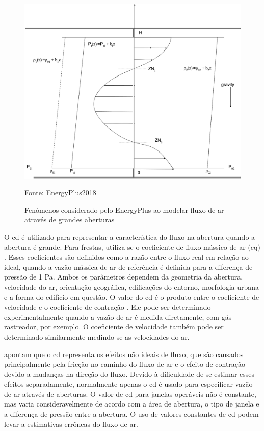 \documentclass[brazil,hardcopy,openany]{ufscthesis} %
\newcommand{\source}[1]{\small \caption*{Fonte: {#1}} } %
\newcommand{\figsize}{.6}
\begin{document}
\begin{figure}[h]
	\centering
	\caption{Fenômenos considerado pelo EnergyPlus ao modelar fluxo de ar através de grandes aberturas}
	\includegraphics[width=\figsize\linewidth]{img/detailed_opening.png}
	\label{fig:DetailedOpening}
	\source{EnergyPlus2018}
\end{figure}

O \acrfull{cd} é utilizado para representar a característica do fluxo na abertura quando a abertura é grande. Para frestas, utiliza-se o coeficiente de fluxo mássico de ar (\acrshort{cq}) \cite{Arendt2017}.
Esses coeficientes são definidos como a razão entre o fluxo real em relação ao	ideal, quando a vazão mássica de ar de referência é definida para a diferença de pressão de 1 Pa. Ambos os parâmetros dependem da geometria da abertura, velocidade do ar, orientação geográfica, edificações do entorno, morfologia urbana e a forma do edifício em questão.
O valor do \acrshort{cd} é o produto entre o coeficiente de velocidade e o coeficiente de contração \cite{Flourentzou1998}. Ele pode ser determinado experimentalmente quando a vazão de ar é medida diretamente, com gás rastreador, por exemplo. O coeficiente de velocidade também pode ser determinado similarmente medindo-se as velocidades do ar.

 apontam que o \acrshort{cd} representa os efeitos não ideais de fluxo, que são causados principalmente pela fricção no caminho do fluxo de ar e o efeito de contração devido a mudanças na direção do fluxo. Devido à dificuldade de se estimar esses efeitos separadamente, normalmente apenas o \acrshort{cd} é usado para especificar vazão de ar através de aberturas. O valor de \acrshort{cd} para janelas operáveis não é constante, mas varia consideravelmente de acordo com a área de abertura, o tipo de janela e a diferença de pressão entre a abertura. O uso de valores constantes de \acrshort{cd} podem levar a estimativas errôneas do fluxo de ar.
\end{document}
